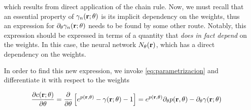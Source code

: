 which results from direct application of the chain rule. Now, we must recall that an
essential property of $\gamma_{n}(\mathbf{r}; \theta)$ is its implicit dependency on the
weights, thus an expression for $\partial_{\theta} \gamma_{n}(\mathbf{r}; \theta)$ needs to
be found by some other route. Notably, this expression should be expressed in terms
of a quantity that \emph{does in fact depend} on the weights. In this case, the neural
network $N_{\theta}(\mathbf{r})$, which has a direct dependency on the weights.

In order to find this new expression, we invoke \autoref{eq:parametrizacion} and
differentiate it with respect to the weights

\begin{equation}
    \frac{\partial c(\mathbf{r}; \theta)}{\partial \theta} = \frac{\partial}{\partial \theta}
    \left[ e^{p(\mathbf{r}, \theta)} - \gamma(\mathbf{r}; \theta) - 1 \right] =
    e^{p(\mathbf{r}, \theta)} \partial_{\theta} p(\mathbf{r}, \theta) - \partial_{\theta} \gamma(\mathbf{r}; \theta)
    \label{eq:grad3}
\end{equation}